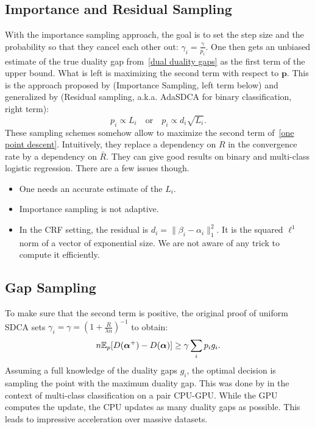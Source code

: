 \subsection{Importance and Residual Sampling}
With the importance sampling approach, the goal is to set the step size and the probability so that they cancel each other out: $\gamma_i = \frac{\gamma}{p_i}$.
One then gets an unbiased estimate of the true duality gap from~\eqref{dual duality gaps} as the first term of the upper bound.
What is left is maximizing the second term with respect to $\bm p$.
This is the approach proposed by \citet{Zhao2015StochasticOptimizationImportance} (Importance Sampling, left term below) and generalized by \citet{csiba2015stochastic} (Residual sampling, a.k.a. AdaSDCA for binary classification, right term):
\begin{equation}
	p_i \propto L_i \quad \text{or} \quad p_i \propto d_i \sqrt{L_i}.
\end{equation}
These sampling schemes somehow allow to maximize the second term of~\eqref{one point descent}.
Intuitively, they replace a dependency on $R$ in the convergence rate by a dependency on $\bar R$.
They can give good results on binary and multi-class logistic regression. There are a few issues though.
\vspace{-\topsep}
\begin{itemize}
	\setlength{\parskip}{0pt}
	\setlength{\itemsep}{3pt plus 1pt}
	\item One needs an accurate estimate of the $L_i$.
	\item Importance sampling is not adaptive.
	\item In the CRF setting, the residual is $d_i = \| \beta_i -\alpha_i \|_1^2$.
	It is the squared $\ell^1$ norm of a vector of exponential size.
	We are not aware of any trick to compute it efficiently.
\end{itemize}
\vspace{-\topsep}

\subsection{Gap Sampling}\label{ssec:gap_sampling}
To make sure that the second term is positive, the original proof of uniform SDCA sets  $\gamma_i = \gamma = {(1+ \frac{R}{\lambda n})^{-1}}$ to obtain:
\begin{equation}
	n \mathbb E_p[D(\boldsymbol{\alpha}^+) - D(\boldsymbol{\alpha})]
	\geq \gamma \sum_i p_i g_i.
\end{equation}
Assuming a full knowledge of the duality gaps $g_i$, the optimal decision is sampling the point with the maximum duality gap.
This was done by \citet{dunner2017efficient} in the context of multi-class classification on a pair CPU-GPU. While the GPU computes the update, the CPU updates as many duality gaps as possible.
This leads to impressive acceleration over massive datasets.

